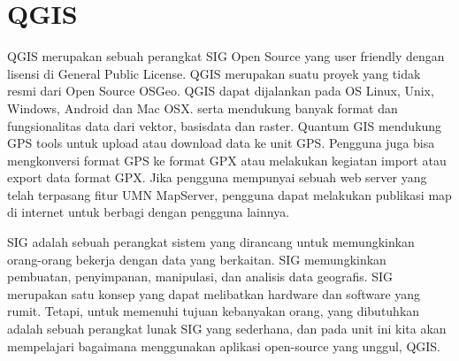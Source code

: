 
\section{QGIS}
QGIS merupakan sebuah perangkat SIG Open Source yang user friendly dengan lisensi di General Public License. QGIS merupakan suatu proyek yang tidak resmi dari Open Source OSGeo. QGIS dapat dijalankan pada OS Linux, Unix, Windows, Android dan Mac OSX. serta mendukung banyak format dan fungsionalitas data dari vektor, basisdata dan raster.
Quantum GIS mendukung GPS tools untuk upload atau download data ke unit GPS. Pengguna juga bisa mengkonversi format GPS ke format GPX atau melakukan kegiatan import atau export data format GPX.
Jika pengguna mempunyai sebuah web server yang telah terpasang fitur UMN MapServer, pengguna dapat melakukan publikasi map di internet untuk berbagi dengan pengguna lainnya.

SIG adalah sebuah perangkat sistem yang dirancang untuk memungkinkan orang-orang bekerja dengan data yang berkaitan. SIG memungkinkan pembuatan, penyimpanan, manipulasi, dan analisis data geografis. SIG merupakan satu konsep yang dapat melibatkan hardware dan software yang rumit. Tetapi, untuk memenuhi tujuan kebanyakan orang, yang dibutuhkan adalah sebuah perangkat lunak SIG yang sederhana, dan pada unit ini kita akan mempelajari bagaimana menggunakan aplikasi open-source yang unggul, QGIS.

